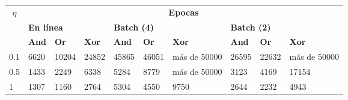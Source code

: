 \begin{table}[H]
    \begin{tabular}{|l|lllllllll|}
    \hline
    \multicolumn{1}{|c|}{\multirow{3}{*}{\textbf{$\eta$}}} & \multicolumn{9}{c|}{\textbf{Epocas}}                                                                                                                                                                                                                                                                      \\ \cline{2-10} 
    \multicolumn{1}{|c|}{}                                 & \multicolumn{3}{l|}{\textbf{En línea}}                                                                   & \multicolumn{3}{l|}{\textbf{Batch (4)}}                                                                  & \multicolumn{3}{l|}{\textbf{Batch (2)}}                                             \\ \cline{2-10} 
    \multicolumn{1}{|c|}{}                                 & \multicolumn{1}{l|}{\textbf{And}} & \multicolumn{1}{l|}{\textbf{Or}} & \multicolumn{1}{l|}{\textbf{Xor}} & \multicolumn{1}{l|}{\textbf{And}} & \multicolumn{1}{l|}{\textbf{Or}} & \multicolumn{1}{l|}{\textbf{Xor}} & \multicolumn{1}{l|}{\textbf{And}} & \multicolumn{1}{l|}{\textbf{Or}} & \textbf{Xor} \\ \hline
    0.1                                                    & \multicolumn{1}{l|}{6620}         & \multicolumn{1}{l|}{10204}       & \multicolumn{1}{l|}{24852}        & \multicolumn{1}{l|}{45865}        & \multicolumn{1}{l|}{46051}       & \multicolumn{1}{l|}{más de 50000} & \multicolumn{1}{l|}{26595}        & \multicolumn{1}{l|}{22632}       & más de 50000 \\ \hline
    0.5                                                    & \multicolumn{1}{l|}{1433}         & \multicolumn{1}{l|}{2249}        & \multicolumn{1}{l|}{6338}         & \multicolumn{1}{l|}{5284}         & \multicolumn{1}{l|}{8779}        & \multicolumn{1}{l|}{más de 50000} & \multicolumn{1}{l|}{3123}         & \multicolumn{1}{l|}{4169}        & 17154        \\ \hline
    1                                                      & \multicolumn{1}{l|}{1307}         & \multicolumn{1}{l|}{1160}        & \multicolumn{1}{l|}{2764}         & \multicolumn{1}{l|}{5304}         & \multicolumn{1}{l|}{4550}        & \multicolumn{1}{l|}{9750}         & \multicolumn{1}{l|}{2644}         & \multicolumn{1}{l|}{2232}        & 4943         \\ \hline

\end{tabular}
\end{table}

